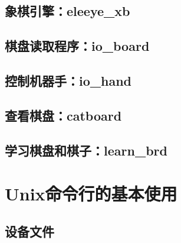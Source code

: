 \documentclass[a4paper]{article}
\begin{document}

\subsection{象棋引擎：eleeye\_xb}
\subsection{棋盘读取程序：io\_board}
\subsection{控制机器手：io\_hand}
\subsection{查看棋盘：catboard}
\subsection{学习棋盘和棋子：learn\_brd}















\clearpage
\appendix
\section{Unix命令行的基本使用}
\label{app1}
\subsection{设备文件}
\label{dev}
\end{document}
